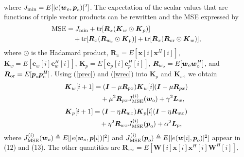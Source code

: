 \documentclass[10pt,onecolumn]{IEEEtran}
\begin{document}
where $J_{\rm min} = E[|e({\boldsymbol w}_o,{\boldsymbol p}_o)|^2]$.
The expectation of the scalar values that are functions of triple
vector products can be rewritten \cite{haykin} and the MSE expressed
by
\begin{equation}
\begin{split}
{\rm MSE} & = J_{\rm min} + {\rm tr}[{\boldsymbol R}_x ({\boldsymbol
K}_w \odot {\boldsymbol K}_p) ] \\ & \quad + {\rm tr}[{\boldsymbol
R}_x ({\boldsymbol R}_{w_{\rm o}} \odot {\boldsymbol K}_{p})] + {\rm
tr}[{\boldsymbol R}_x ( {\boldsymbol R}_{\rm or} \odot {\boldsymbol
K}_{w})], \label{mse_trace}
\end{split}
\end{equation}
where $\odot$ is the Hadamard product, ${\boldsymbol
R}_x=E[{\boldsymbol x}[i]{\boldsymbol x}^H[i]]$, ${\boldsymbol K}_w
= E[{\boldsymbol e}_w[i]{\boldsymbol e}_{w}^H[i]]$, ${\boldsymbol
K}_{p} = E[{\boldsymbol e}_{p}[i] {\boldsymbol e}_{p}^H[i]]$,
${\boldsymbol R}_{w_{\rm o}} = E[{\boldsymbol w}_{\rm o}
{\boldsymbol w}_{\rm o}^H]$, and ${\boldsymbol R}_{\rm or} =
E[{\boldsymbol p}_{\rm o}{\boldsymbol p}_{\rm o}^H]$. Using
(\ref{prec}) and (\ref{wrec}) into ${\boldsymbol K}_{p}$ and
${\boldsymbol K}_{w}$, we obtain
\begin{equation}
\begin{split}
{\boldsymbol K}_{w}[i+1] & = ({\boldsymbol I} - \mu{\boldsymbol
R}_{px}){\boldsymbol K}_{w}[i]({\boldsymbol I} - \mu{\boldsymbol
R}_{px}) \\ & \quad+ \mu^2 {\boldsymbol R}_{px}J_{\rm
MSE}^{(i)}({\boldsymbol w}_{\rm o})  + \gamma^2 {\boldsymbol L}_w,
\end{split}
\end{equation}
\begin{equation}
\begin{split}
{\boldsymbol K}_{p}[i+1] & = ({\boldsymbol I} - \eta {\boldsymbol
R}_{wx}){\boldsymbol K}_{p}[i]({\boldsymbol I} - \eta {\boldsymbol
R}_{wx}) \\ & \quad + \eta^2 {\boldsymbol R}_{wx}J_{\rm
MSE}^{(i)}({\boldsymbol p}_{\rm o})  + \alpha^2 {\boldsymbol L}_p,
\end{split}
\end{equation}
where $J_{\rm MSE}^{(i)}({\boldsymbol w}_o) \triangleq
E[|e({\boldsymbol w}_o, {\boldsymbol p}[i])|^2]$ and $J_{\rm
MSE}^{(i)}({\boldsymbol p}_o) \triangleq E[|e({\boldsymbol w}[i],
{\boldsymbol p}_o)|^2]$ appear in (12) and (13). The other
quantities are ${\boldsymbol R}_{wx} = E[{\boldsymbol
W}[i]{\boldsymbol x}[i] {\boldsymbol x}^H[i] {\boldsymbol W}^H[i]]$,
\end{document}
